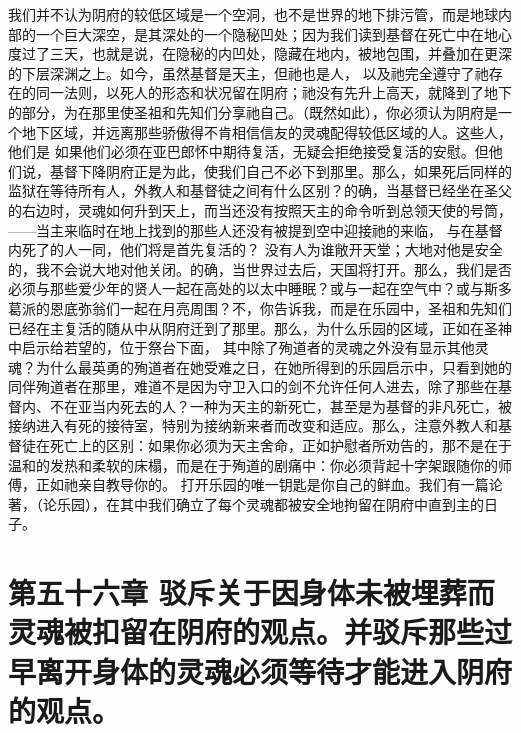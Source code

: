 我们并不认为阴府的较低区域是一个空洞，也不是世界的地下排污管，而是地球内部的一个巨大深空，是其深处的一个隐秘凹处；因为我们读到基督在死亡中在地心度过了三天，也就是说，在隐秘的内凹处，隐藏在地内，被地包围，并叠加在更深的下层深渊之上。如今，虽然基督是天主，但祂也是人， 以及祂完全遵守了祂存在的同一法则，以死人的形态和状况留在阴府；祂没有先升上高天，就降到了地下的部分，为在那里使圣祖和先知们分享祂自己。（既然如此），你必须认为阴府是一个地下区域，并远离那些骄傲得不肯相信信友的灵魂配得较低区域的人。这些人，他们是 如果他们必须在亚巴郎怀中期待复活，无疑会拒绝接受复活的安慰。但他们说，基督下降阴府正是为此，使我们自己不必下到那里。那么，如果死后同样的监狱在等待所有人，外教人和基督徒之间有什么区别？的确，当基督已经坐在圣父的右边时，灵魂如何升到天上，而当还没有按照天主的命令听到总领天使的号筒，——当主来临时在地上找到的那些人还没有被提到空中迎接祂的来临， 与在基督内死了的人一同，他们将是首先复活的？ 没有人为谁敞开天堂；大地对他是安全的，我不会说大地对他关闭。的确，当世界过去后，天国将打开。那么，我们是否必须与那些爱少年的贤人一起在高处的以太中睡眠？或与一起在空气中？或与斯多葛派的恩底弥翁们一起在月亮周围？不，你告诉我，而是在乐园中，圣祖和先知们已经在主复活的随从中从阴府迁到了那里。那么，为什么乐园的区域，正如在圣神中启示给若望的，位于祭台下面， 其中除了殉道者的灵魂之外没有显示其他灵魂？为什么最英勇的殉道者在她受难之日，在她所得到的乐园启示中，只看到她的同伴殉道者在那里，难道不是因为守卫入口的剑不允许任何人进去，除了那些在基督内、不在亚当内死去的人？一种为天主的新死亡，甚至是为基督的非凡死亡，被接纳进入有死的接待室，特别为接纳新来者而改变和适应。那么，注意外教人和基督徒在死亡上的区别：如果你必须为天主舍命，正如护慰者所劝告的，那不是在于温和的发热和柔软的床榻，而是在于殉道的剧痛中：你必须背起十字架跟随你的师傅，正如祂亲自教导你的。 打开乐园的唯一钥匙是你自己的鲜血。我们有一篇论著，（论乐园），在其中我们确立了每个灵魂都被安全地拘留在阴府中直到主的日子。\par


\section{第五十六章 驳斥关于因身体未被埋葬而灵魂被扣留在阴府的观点。并驳斥那些过早离开身体的灵魂必须等待才能进入阴府的观点。}

